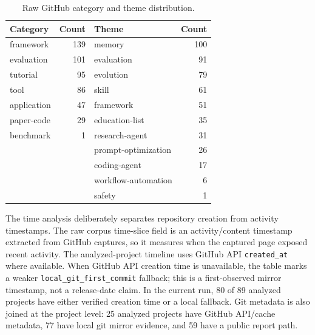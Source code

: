 \begin{table}[t]
\centering
\caption{Raw GitHub category and theme distribution.}
\label{tab:github-category-theme-distribution}
\begin{tabular}{lrlr}
\toprule
Category & Count & Theme & Count \\
\midrule
framework & 139 & memory & 100 \\
evaluation & 101 & evaluation & 91 \\
tutorial & 95 & evolution & 79 \\
tool & 86 & skill & 61 \\
application & 47 & framework & 51 \\
paper-code & 29 & education-list & 35 \\
benchmark & 1 & research-agent & 31 \\
 &  & prompt-optimization & 26 \\
 &  & coding-agent & 17 \\
 &  & workflow-automation & 6 \\
 &  & safety & 1 \\
\bottomrule
\end{tabular}
\end{table}

The time analysis deliberately separates repository creation from activity timestamps. The raw corpus time-slice field is an activity/content timestamp extracted from GitHub captures, so it measures when the captured page exposed recent activity. The analyzed-project timeline uses GitHub API \texttt{created\_at} where available. When GitHub API creation time is unavailable, the table marks a weaker \texttt{local\_git\_first\_commit} fallback; this is a first-observed mirror timestamp, not a release-date claim. In the current run, 80 of 89 analyzed projects have either verified creation time or a local fallback. Git metadata is also joined at the project level: 25 analyzed projects have GitHub API/cache metadata, 77 have local git mirror evidence, and 59 have a public report path.

